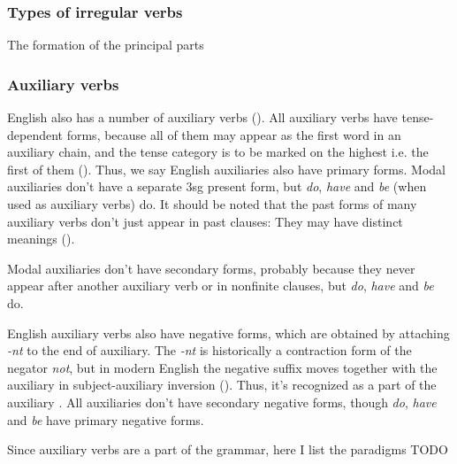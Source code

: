 \documentclass[UTF8, a4paper, oneside, scheme=plain]{ctexrep}
\newcommand*{\citepage}[1]{pp.~{#1}}
\newcommand{\corpus}[1]{\emph{#1}}
\begin{document}
\subsubsection{Types of irregular verbs}

The formation of the principal parts 

\subsubsection{Auxiliary verbs}\label{sec:verb-inflection.auxiliary}

English also has a number of auxiliary verbs ().
All auxiliary verbs have tense-dependent forms,
because all of them may appear as the first word in an auxiliary chain,
and the tense category is to be marked on the highest i.e. the first of them ().
Thus, we say English auxiliaries also have primary forms.
Modal auxiliaries don't have a separate 3sg present form,
but \corpus{do}, \corpus{have} and \corpus{be} (when used as auxiliary verbs) do.
It should be noted that the past forms of many auxiliary verbs don't just appear in past clauses:
They may have distinct meanings ().

Modal auxiliaries don't have secondary forms,
probably because they never appear after another auxiliary verb 
or in nonfinite clauses,
but \corpus{do}, \corpus{have} and \corpus{be} do.

English auxiliary verbs also have negative forms,
which are obtained by attaching \corpus{-nt} to the end of auxiliary.
The \corpus{-nt} is historically a contraction form of the negator \corpus{not},
but in modern English the negative suffix moves together with the auxiliary in
subject-auxiliary inversion ().
Thus, it's recognized as a part of the auxiliary \citep[\citepage{91}]{cgel}.
All auxiliaries don't have secondary negative forms,
though \corpus{do}, \corpus{have} and \corpus{be} have primary negative forms.

Since auxiliary verbs are a part of the grammar,
here I list the paradigms TODO
\end{document}
